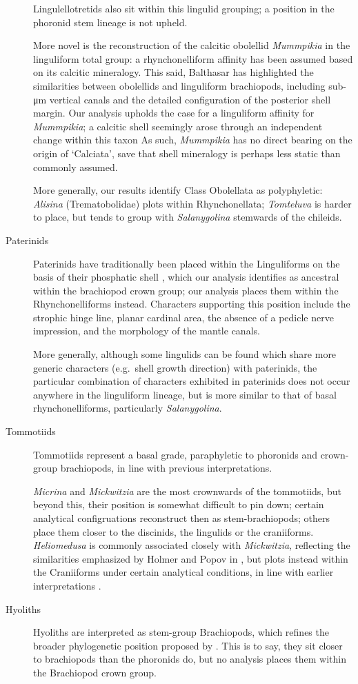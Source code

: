 \documentclass[openany]{book}
\theoremstyle{definition}
\theoremstyle{definition}
\theoremstyle{definition}
\theoremstyle{remark}
\begin{document}
\begin{description}
Lingulellotretids also sit within this lingulid grouping; a position in
the phoronid stem lineage \citep[advocated
by][]{Balthasar2009EarlyCambrian} is not upheld.

More novel is the reconstruction of the calcitic obolellid
\emph{Mummpikia} in the linguliform total group: a rhynchonelliform
affinity has been assumed based on its calcitic mineralogy. This said,
Balthasar \citeyearpar{Balthasar2008iMummpikia} has highlighted the
similarities between obolellids and linguliform brachiopods, including
sub-μm vertical canals and the detailed configuration of the posterior
shell margin. Our analysis upholds the case for a linguliform affinity
for \emph{Mummpikia}; a calcitic shell seemingly arose through an
independent change within this taxon As such, \emph{Mummpikia} has no
direct bearing on the origin of `Calciata', save that shell mineralogy
is perhaps less static than commonly assumed.

More generally, our results identify Class Obolellata as polyphyletic:
\emph{Alisina} (Trematobolidae) plots within Rhynchonellata;
\emph{Tomteluva} is harder to place, but tends to group with
\emph{Salanygolina} stemwards of the chileids.
\item[Paterinids]
Paterinids have traditionally been placed within the Linguliforms on the
basis of their phosphatic shell \citep{Williams2007PartH}, which our
analysis identifies as ancestral within the brachiopod crown group; our
analysis places them within the Rhynchonelliforms instead. Characters
supporting this position include the strophic hinge line, planar
cardinal area, the absence of a pedicle nerve impression, and the
morphology of the mantle canals.

More generally, although some lingulids can be found which share more
generic characters (e.g.~shell growth direction) with paterinids, the
particular combination of characters exhibited in paterinids does not
occur anywhere in the linguliform lineage, but is more similar to that
of basal rhynchonelliforms, particularly \emph{Salanygolina}.
\item[Tommotiids]
Tommotiids represent a basal grade, paraphyletic to phoronids and
crown-group brachiopods, in line with previous interpretations.

\emph{Micrina} and \emph{Mickwitzia} are the most crownwards of the
tommotiids, but beyond this, their position is somewhat difficult to pin
down; certain analytical configruations reconstruct then as
stem-brachiopods; others place them closer to the discinids, the
lingulids or the craniiforms. \emph{Heliomedusa} is commonly associated
closely with \emph{Mickwitzia}, reflecting the similarities emphasized
by Holmer and Popov in \citet{Williams2007PartH}, but plots instead
within the Craniiforms under certain analytical conditions, in line with
earlier interpretations \citep{Williams2000BrachiopodaLinguliformea}.
\item[Hyoliths]
Hyoliths are interpreted as stem-group Brachiopods, which refines the
broader phylogenetic position proposed by
\citet{Moysiuk2017Hyolithsare}. This is to say, they sit closer to
brachiopods than the phoronids do, but no analysis places them within
the Brachiopod crown group.


\end{description}
\end{document}
